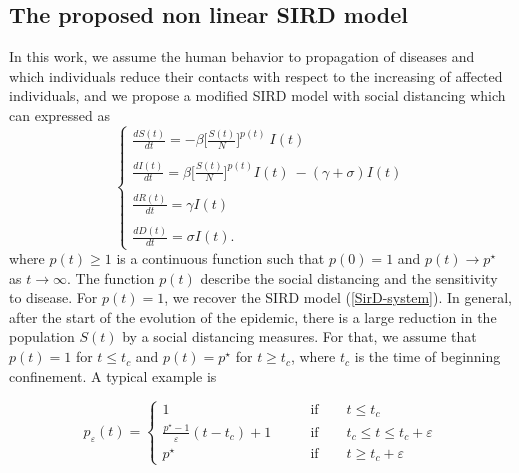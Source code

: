 \documentclass[final,a4paper,reqno]{elsarticle}
\numberwithin{equation}{section}
\begin{document}
\subsection{ The proposed non linear SIRD  model }
In this work, we assume the human behavior to propagation of diseases and which individuals reduce their contacts with respect to the increasing  of affected  individuals, and we  propose a modified SIRD model with social distancing  which can expressed as 
\begin{equation}\label{Sir-gen-system}
\begin{cases}
\displaystyle \frac{ dS(t)}{dt} = -{\beta} \Big[\frac{S(t)}{N}\Big]^{p(t)} \: I(t)\\ \\
\displaystyle  \frac{ dI(t)}{dt}  = {\beta} \Big[\frac{S(t)}{N}\Big]^{p(t)}  I(t)\ -(\gamma+\sigma) I(t)\\  \\
\displaystyle  \frac{ dR(t)}{dt} = \gamma I(t) \\ \\
\displaystyle  \frac{ dD(t)}{dt} = \sigma I(t).
\end{cases}
\end{equation}
where $p(t)\geq 1$ is a continuous function  such that $p(0)=1$ and $p(t)\to p^\star$ as $t\to \infty $. The function $p(t)$ describe the social distancing  and the sensitivity to disease. For $p(t)=1$, we recover the SIRD model (\ref{SirD-system}). In  general, after the start of the evolution of the epidemic,
there is a  large reduction in the population $S(t)$ by a social distancing measures.  For that, we assume that
$ p(t)= 1$  for $ t\leq t_c$ and  $ p(t)= p^\star$  for $t\geq t_c$, where $t_c$ is the time of beginning confinement. A typical example is

\begin{equation}\label{p}
p_\varepsilon(t)=
\begin{cases}
\displaystyle 1  &\qquad \mbox{if}  \qquad  t\leq t_c\\ 
\displaystyle  \frac{p^\star-1}{\varepsilon} (t-t_c) + 1 & \qquad \mbox{if}  \qquad t_c \leq t\leq t_c+\varepsilon\\ 
\displaystyle  p^\star  &\qquad \mbox{if}  \qquad  t\geq t_c+\varepsilon
\end{cases}
\end{equation}
\end{document}
